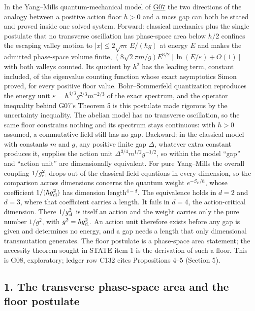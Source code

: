 \documentclass[11pt,a4paper]{article}
\begin{document}
In the Yang--Mills quantum-mechanical model of
\href{low-dimensional-mass-gap.md}{G07} the two directions of the
analogy between a positive action floor \(h>0\) and a mass gap can both
be stated and proved inside one solved system. Forward: classical
mechanics plus the single postulate that no transverse oscillation has
phase-space area below \(h/2\) confines the escaping valley motion to
\(|x|\le2\sqrt m\,E/(\hbar g)\) at energy \(E\) and makes the admitted
phase-space volume finite,
\((8\sqrt2\pi m/g)E^{3/2}[\ln(E/\varepsilon)+O(1)]\) with both valleys
counted. Its quotient by \(h^2\) has the leading term, constant
included, of the eigenvalue counting function whose exact asymptotics
Simon proved, for every positive floor value. Bohr--Sommerfeld
quantization reproduces the energy unit
\(\varepsilon=\hbar^{4/3}g^{2/3}m^{-2/3}\) of the exact spectrum, and
the operator inequality behind G07's Theorem 5 is this postulate made
rigorous by the uncertainty inequality. The abelian model has no
transverse oscillation, so the same floor constrains nothing and its
spectrum stays continuous: with \(h>0\) assumed, a commutative field
still has no gap. Backward: in the classical model with constants \(m\)
and \(g\), any positive finite gap \(\Delta\), whatever extra constant
produces it, supplies the action unit \(\Delta^{3/4}m^{1/2}g^{-1/2}\),
so within the model ``gap'' and ``action unit'' are dimensionally
equivalent. For pure Yang--Mills the overall coupling \(1/g_{\rm cl}^2\)
drops out of the classical field equations in every dimension, so the
comparison across dimensions concerns the quantum weight
\(e^{-S_E/\hbar}\), whose coefficient \(1/(\hbar g_{\rm cl}^2)\) has
dimension length\(^{4-d}\). The equivalence holds in \(d=2\) and
\(d=3\), where that coefficient carries a length. It fails in \(d=4\),
the action-critical dimension. There \(1/g_{\rm cl}^2\) is itself an
action and the weight carries only the pure number \(1/g^2\), with
\(g^2=\hbar g_{\rm cl}^2\). An action unit therefore exists before any
gap is given and determines no energy, and a gap needs a length that
only dimensional transmutation generates. The floor postulate is a
phase-space area statement; the necessity theorem sought in STATE item 1
is the derivation of such a floor. This is G08, exploratory; ledger row
C132 cites Propositions 4--5 (Section 5).

\subsection{1. The transverse phase-space area and the floor
postulate}\label{the-transverse-phase-space-area-and-the-floor-postulate}
\end{document}

